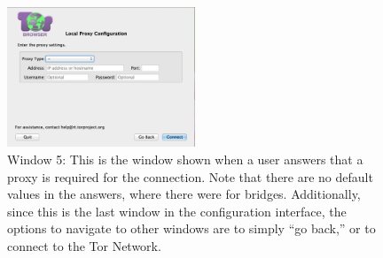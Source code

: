 \documentclass{template}
\begin{document}
\begin{figure}[h]
  \centering
    \includegraphics[width=0.5\textwidth]{window5.png}
    \caption{Window 5: This is the window shown when a user answers that a proxy is 
    required for the connection. Note that there are no default values in the answers, 
    where there were for bridges. Additionally, since this is the last window in the configuration
    interface, the options to navigate to other windows are to simply ``go back,'' or to 
    connect to the Tor Network.}
\label{fig:window5}
\end{figure}
\end{document}
